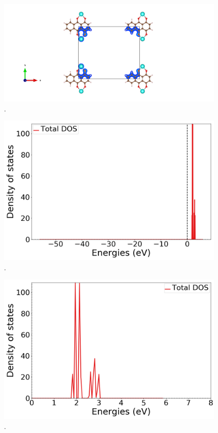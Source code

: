 \documentclass{article}
\begin{document}
  \begin{figure}[H]
      \centering
      \includegraphics[width = 11cm]{../fig/Yb_staticafter_CHGCAR.png}
      \caption{. }
      \label{fig:Yb_staticafter_CHGCAR}
  \end{figure}
  \fi

  \begin{figure}[H]
      \centering
      \includegraphics[width = 11cm]{../fig/Yb_k4_TDOS_1.png}
      \caption{. }
      \label{fig:Yb_k4_TDOS_1.png}
  \end{figure}

  \begin{figure}[H]
      \centering
      \includegraphics[width = 11cm]{../fig/Yb_k4_TDOS_2.png}
      \caption{. }
      \label{fig:Yb_k4_TDOS_2.png}
  \end{figure}
\end{document}

